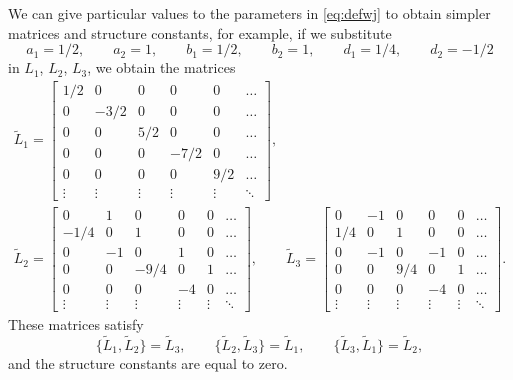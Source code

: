 \documentclass[pdftex]{sigma}
\numberwithin{equation}{section}
\begin{document}
	We can give particular values to the parameters in \eqref{eq:defwj} to obtain simpler matrices and structure constants, for example, if we substitute
	\[ a_1=1/2,\qquad a_2=1,\qquad b_1=1/2,\qquad b_2=1,\qquad d_1=1/4,\qquad d_2=-1/2 \]
in $L_1$, $L_2$, $L_3$, we obtain the matrices
	\begin{gather*}%
		\tilde{L}_1= \begin{bmatrix} 1/2 & 0 & 0 & 0 & 0 & \dots \\
			0  & -3/2 & 0 & 0 & 0 & \dots \\
			0 & 0  & 5/2  & 0 & 0  & \dots \\
			0 & 0 & 0  & -7/2 & 0 & \dots \\
      0 & 0 & 0  & 0  & 9/2 & \dots \\
		\vdots  & \vdots  & \vdots  & \vdots & \vdots  &  \ddots  \end{bmatrix},
\\%
	\tilde{L}_2 = \begin{bmatrix} 0 & 1 & 0 & 0 & 0 & \dots \\
			-1/4 & 0 & 1 & 0 & 0 & \dots \\
			0 & -1 & 0  & 1 &0 & \dots \\
			0 & 0 & -9/4 & 0 & 1 & \dots \\
      0 & 0 & 0  & -4  & 0  & \dots \\
		\vdots  & \vdots  & \vdots  & \vdots  & \vdots  & \ddots  \end{bmatrix},
\qquad
		\tilde{L}_3 = \begin{bmatrix} 0 & -1 & 0 & 0 & 0 & \dots \\
			1/4 & 0 & 1 & 0 & 0 & \dots \\
			0 & -1 & 0  & -1 &0 & \dots \\
			0 & 0 & 9/4 & 0 & 1 & \dots \\
      0 & 0 & 0  & -4  & 0  & \dots \\
		\vdots  & \vdots  & \vdots  & \vdots  & \vdots  & \ddots  \end{bmatrix}.
\end{gather*}
These matrices satisfy{\samepage
\[ \bigl\{\tilde{L}_1, \tilde{L}_2\bigr\}= \tilde{L}_3,\qquad \bigl\{\tilde{L}_2, \tilde{L}_3\bigr\}= \tilde{L}_1, \qquad \bigl\{\tilde{L}_3, \tilde{L}_1\bigr\}= \tilde{L}_2, \]
and the structure constants are equal to zero.}
\end{document}

